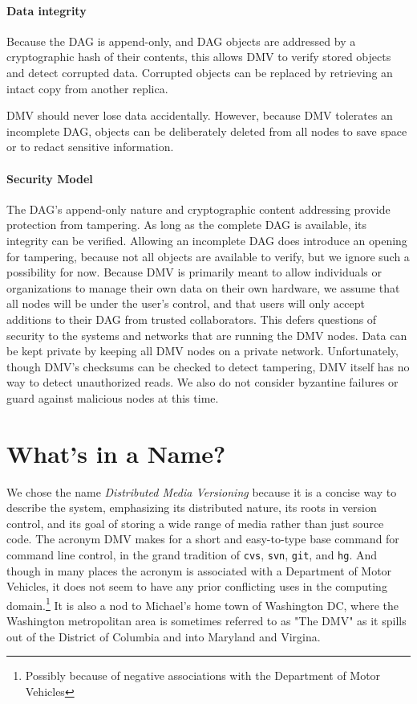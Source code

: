 \paragraph{Data integrity}

Because the DAG is append-only, and DAG objects are addressed by a cryptographic
hash of their contents, this allows \gls{DMV} to verify stored objects and
detect corrupted data. Corrupted objects can be replaced by retrieving an intact
copy from another replica.

\gls{DMV} should never lose data accidentally. However, because \gls{DMV}
tolerates an incomplete DAG, objects can be deliberately deleted from all nodes
to save space or to redact sensitive information.


\paragraph{Security Model}

The DAG's append-only nature and cryptographic content addressing provide
protection from tampering. As long as the complete DAG is available, its
integrity can be verified. Allowing an incomplete DAG does introduce an opening
for tampering, because not all objects are available to verify, but we ignore
such a possibility for now. Because \gls{DMV} is primarily meant to allow
individuals or organizations to manage their own data on their own hardware, we
assume that all nodes will be under the user's control, and that users will only
accept additions to their DAG from trusted collaborators. This defers questions
of security to the systems and networks that are running the \gls{DMV} nodes.
Data can be kept private by keeping all \gls{DMV} nodes on a private network.
Unfortunately, though \gls{DMV}'s checksums can be checked to detect tampering,
\gls{DMV} itself has no way to detect unauthorized reads. We also do not
consider byzantine failures or guard against malicious nodes at this time.

%


\section{What's in a Name?}

We chose the name \emph{Distributed Media Versioning} because it is a concise
way to describe the system, emphasizing its distributed nature, its roots in
version control, and its goal of storing a wide range of media rather than just
source code. The acronym \gls{DMV} makes for a short and easy-to-type base
command for command line control, in the grand tradition of \lstinline{cvs},
\lstinline{svn}, \lstinline{git}, and \lstinline{hg}. And though in many places
the acronym is associated with a Department of Motor Vehicles, it does not seem
to have any prior conflicting uses in the computing domain.\footnote{Possibly
because of negative associations with the Department of Motor Vehicles} It is
also a nod to Michael's home town of Washington DC, where the Washington
metropolitan area is sometimes referred to as "The DMV" as it spills out of the
District of Columbia and into Maryland and Virgina.
